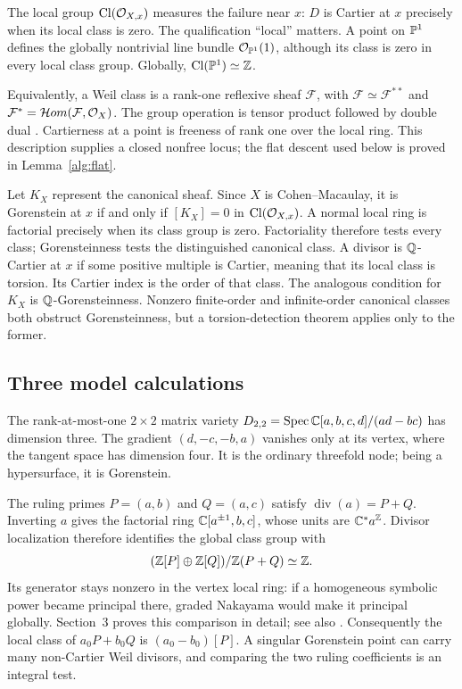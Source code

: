 The local group $\operatorname{Cl}(\mathcal O_{X,x})$ measures the failure near $x$: $D$ is Cartier at $x$ precisely when its local class is zero. The qualification ``local'' matters. A point on $\mathbb P^1$ defines the globally nontrivial line bundle $\mathcal O_{\mathbb P^1}(1)$, although its class is zero in every local class group. Globally, $\operatorname{Cl}(\mathbb P^1)\simeq\mathbb Z$.

Equivalently, a Weil class is a rank-one reflexive sheaf $\mathcal F$, with $\mathcal F\simeq\mathcal F^{**}$ and $\mathcal F^*=\mathcal Hom(\mathcal F,\mathcal O_X)$. The group operation is tensor product followed by double dual \cite[Tags 0EBJ, 0EBM]{The26}. Cartierness at a point is freeness of rank one over the local ring. This description supplies a closed nonfree locus; the flat descent used below is proved in Lemma~\ref{alg:flat}.

Let $K_X$ represent the canonical sheaf. Since $X$ is Cohen--Macaulay, it is Gorenstein at $x$ if and only if $[K_X]=0$ in $\operatorname{Cl}(\mathcal O_{X,x})$.
A normal local ring is factorial precisely when its class group is zero. Factoriality therefore tests every class; Gorensteinness tests the distinguished canonical class. A divisor is $\mathbb Q$-Cartier at $x$ if some positive multiple is Cartier, meaning that its local class is torsion. Its Cartier index is the order of that class. The analogous condition for $K_X$ is $\mathbb Q$-Gorensteinness. Nonzero finite-order and infinite-order canonical classes both obstruct Gorensteinness, but a torsion-detection theorem applies only to the former.

\subsection{Three model calculations}
\begin{example}\label{ex:node}
The rank-at-most-one $2\times2$ matrix variety $D_{2,2}=\operatorname{Spec}\mathbb C[a,b,c,d]/(ad-bc)$ has dimension three. The gradient $(d,-c,-b,a)$ vanishes only at its vertex, where the tangent space has dimension four. It is the ordinary threefold node; being a hypersurface, it is Gorenstein.

The ruling primes $P=(a,b)$ and $Q=(a,c)$ satisfy $\operatorname{div}(a)=P+Q$. Inverting $a$ gives the factorial ring $\mathbb C[a^{\pm1},b,c]$, whose units are $\mathbb C^*a^{\mathbb Z}$. Divisor localization therefore identifies the global class group with
\[
 (\mathbb Z[P]\oplus\mathbb Z[Q])/\mathbb Z(P+Q)\simeq\mathbb Z.
\]
Its generator stays nonzero in the vertex local ring: if a homogeneous symbolic power became principal there, graded Nakayama would make it principal globally. Section~3 proves this comparison in detail; see also \cite[Section~8]{BV88}. Consequently the local class of $a_0P+b_0Q$ is $(a_0-b_0)[P]$. A singular Gorenstein point can carry many non-Cartier Weil divisors, and comparing the two ruling coefficients is an integral test.
\end{example}

